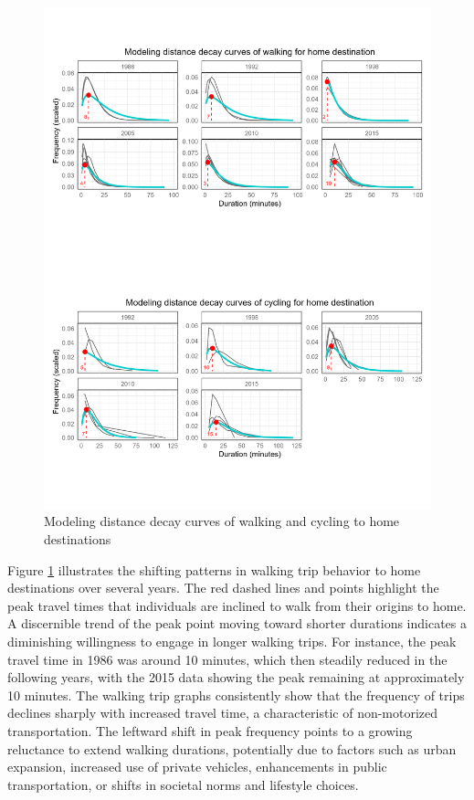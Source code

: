 \documentclass[
11pt, %
oneside, %
english, %
singlespacing, %
]{macthesis} %
\begin{document}
\begin{figure}

{\centering \includegraphics[width=1\linewidth]{figure/ch03_fig_03} 

}

\caption{Modeling distance decay curves of walking and cycling to home destinations}\label{fig:ch03-plot-fig-03}
\end{figure}

Figure \ref{fig:ch03-plot-fig-03} illustrates the shifting patterns in walking trip behavior to home destinations over several years. The red dashed lines and points highlight the peak travel times that individuals are inclined to walk from their origins to home. A discernible trend of the peak point moving toward shorter durations indicates a diminishing willingness to engage in longer walking trips. For instance, the peak travel time in 1986 was around 10 minutes, which then steadily reduced in the following years, with the 2015 data showing the peak remaining at approximately 10 minutes. The walking trip graphs consistently show that the frequency of trips declines sharply with increased travel time, a characteristic of non-motorized transportation. The leftward shift in peak frequency points to a growing reluctance to extend walking durations, potentially due to factors such as urban expansion, increased use of private vehicles, enhancements in public transportation, or shifts in societal norms and lifestyle choices.
\end{document}
